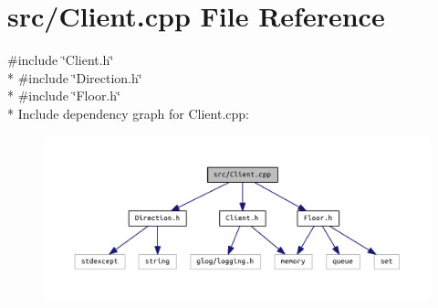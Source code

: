 \section{src/\+Client.cpp File Reference}
\label{_client_8cpp}
{\ttfamily \#include \char`\"{}Client.\+h\char`\"{}}\\*
{\ttfamily \#include \char`\"{}Direction.\+h\char`\"{}}\\*
{\ttfamily \#include \char`\"{}Floor.\+h\char`\"{}}\\*
Include dependency graph for Client.\+cpp\+:
\nopagebreak
\begin{figure}[H]
\begin{center}
\leavevmode
\includegraphics[width=350pt]{_client_8cpp__incl}
\end{center}
\end{figure}
